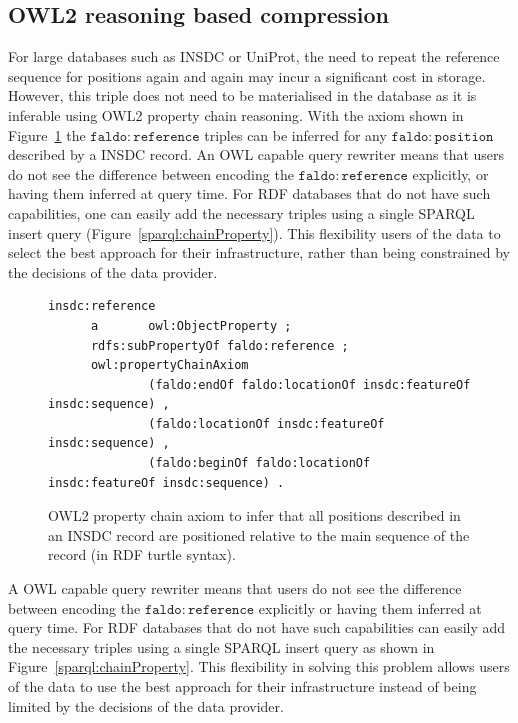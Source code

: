 \subsection*{OWL2 reasoning based compression}
For large databases such as INSDC or UniProt,
the need to repeat the reference sequence for positions again and again may incur a significant cost in storage.
However, this triple does not need to be materialised in the database as it is inferable using OWL2 property chain reasoning.
With the axiom shown in Figure~\ref{owl:chainProperty} the $\mathtt{faldo\colon{}reference}$ triples can be inferred for any $\mathtt{faldo\colon{}position}$ described by a INSDC record.
An OWL capable query rewriter means that users do not see the difference between encoding the $\mathtt{faldo\colon{}reference}$ explicitly, or having them inferred at query time.
For RDF databases that do not have such capabilities,
one can easily add the necessary triples using a single SPARQL insert query (Figure~\ref{sparql:chainProperty}).
This flexibility users of the data to select the best approach for their infrastructure, rather than being constrained by the decisions of the data provider.

\begin{figure}
\begin{shaded}
\small
\begin{verbatim}
insdc:reference
      a       owl:ObjectProperty ;
      rdfs:subPropertyOf faldo:reference ;
      owl:propertyChainAxiom
              (faldo:endOf faldo:locationOf insdc:featureOf insdc:sequence) , 
              (faldo:locationOf insdc:featureOf insdc:sequence) , 
              (faldo:beginOf faldo:locationOf insdc:featureOf insdc:sequence) .

\end{verbatim}
\end{shaded}
\caption{OWL2 property chain axiom to infer that all positions described in an INSDC record are positioned relative to the main sequence of the record (in RDF turtle syntax).}
\label{owl:chainProperty}
\end{figure}

A OWL capable query rewriter means that users do not see the difference between encoding the $\mathtt{faldo\colon{}reference}$ explicitly or having them inferred at query time.
For RDF databases that do not have such capabilities can easily add the necessary triples using a single SPARQL insert query as shown in Figure~\ref{sparql:chainProperty}.
This flexibility in solving this problem allows users of the data to use the best approach for their infrastructure instead of being limited by the decisions of the data provider.

